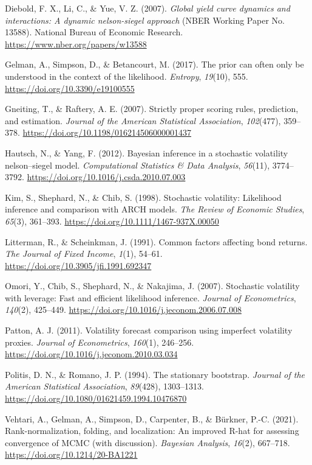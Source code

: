\documentclass[
  12pt,
  letterpaper,
  DIV=11,
  numbers=noendperiod]{scrreprt}
\newlength{\cslhangindent}
\newenvironment{CSLReferences}[2] %
 {\begin{list}{}{%
  \setlength{\itemindent}{0pt}
  \setlength{\leftmargin}{0pt}
  \setlength{\parsep}{0pt}
  \ifodd #1
   \setlength{\leftmargin}{\cslhangindent}
   \setlength{\itemindent}{-1\cslhangindent}
  \fi
  \setlength{\itemsep}{#2\baselineskip}}}
 {\end{list}}
\begin{document}
\begin{CSLReferences}{1}{0}
Diebold, F. X., Li, C., \& Yue, V. Z. (2007). \emph{Global yield curve
dynamics and interactions: A dynamic nelson-siegel approach} (NBER
Working Paper No. 13588). National Bureau of Economic Research.
\url{https://www.nber.org/papers/w13588}

Gelman, A., Simpson, D., \& Betancourt, M. (2017). The prior can often
only be understood in the context of the likelihood. \emph{Entropy},
\emph{19}(10), 555. \url{https://doi.org/10.3390/e19100555}

Gneiting, T., \& Raftery, A. E. (2007). Strictly proper scoring rules,
prediction, and estimation. \emph{Journal of the American Statistical
Association}, \emph{102}(477), 359--378.
\url{https://doi.org/10.1198/016214506000001437}

Hautsch, N., \& Yang, F. (2012). Bayesian inference in a stochastic
volatility nelson--siegel model. \emph{Computational Statistics \& Data
Analysis}, \emph{56}(11), 3774--3792.
\url{https://doi.org/10.1016/j.csda.2010.07.003}

Kim, S., Shephard, N., \& Chib, S. (1998). Stochastic volatility:
Likelihood inference and comparison with ARCH models. \emph{The Review
of Economic Studies}, \emph{65}(3), 361--393.
\url{https://doi.org/10.1111/1467-937X.00050}

Litterman, R., \& Scheinkman, J. (1991). Common factors affecting bond
returns. \emph{The Journal of Fixed Income}, \emph{1}(1), 54--61.
\url{https://doi.org/10.3905/jfi.1991.692347}

Omori, Y., Chib, S., Shephard, N., \& Nakajima, J. (2007). Stochastic
volatility with leverage: Fast and efficient likelihood inference.
\emph{Journal of Econometrics}, \emph{140}(2), 425--449.
\url{https://doi.org/10.1016/j.jeconom.2006.07.008}

Patton, A. J. (2011). Volatility forecast comparison using imperfect
volatility proxies. \emph{Journal of Econometrics}, \emph{160}(1),
246--256. \url{https://doi.org/10.1016/j.jeconom.2010.03.034}

Politis, D. N., \& Romano, J. P. (1994). The stationary bootstrap.
\emph{Journal of the American Statistical Association}, \emph{89}(428),
1303--1313. \url{https://doi.org/10.1080/01621459.1994.10476870}

Vehtari, A., Gelman, A., Simpson, D., Carpenter, B., \& Bürkner, P.-C.
(2021). Rank-normalization, folding, and localization: An improved
{R-hat} for assessing convergence of {MCMC} (with discussion).
\emph{Bayesian Analysis}, \emph{16}(2), 667--718.
\url{https://doi.org/10.1214/20-BA1221}

\end{CSLReferences}
\end{document}
